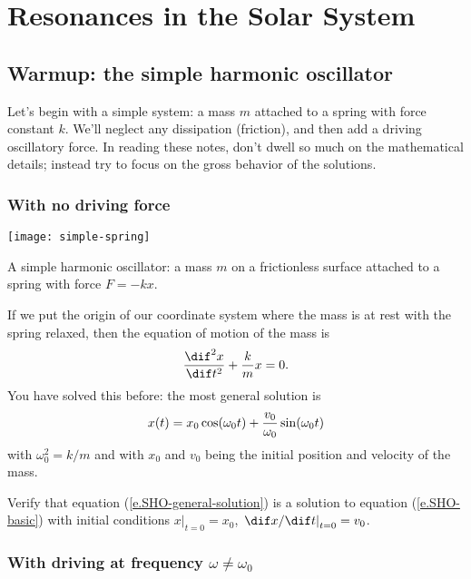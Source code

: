 \chapter{Resonances in the Solar System}

\section{Warmup: the simple harmonic oscillator}

Let's begin with a simple system: a mass $m$ attached to a spring with force constant $k$. We'll neglect any dissipation (friction), and then add a driving oscillatory force. In reading these notes, don't dwell so much on the mathematical details; instead try to focus on the gross behavior of the solutions.

\subsection{With no driving force}

\begin{marginfigure}
\texttt{[image: simple-spring]}
\caption[A simple harmonic oscillator]{A simple harmonic oscillator: a mass $m$ on a frictionless surface attached to a  spring with force $F = -kx$.
\label{f.simple-spring}}
\end{marginfigure}

If we put the origin of our coordinate system where the mass is at rest with the spring relaxed, then the equation of motion of the mass is
\begin{equation}\label{e.SHO-basic}
	\DDtt{x} + \frac{k}{m} x = 0.
\end{equation}
You have solved this before: the most general solution is
\begin{equation}\label{e.SHO-general-solution}
	x(t) = x_{0}\cos(\omega_{0} t) + \frac{v_{0}}{\omega_{0}}\sin(\omega_{0} t)
\end{equation}
with $\omega_{0}^{2} = k/m$ and with $x_{0}$ and $v_{0}$ being the initial position and velocity of the mass.

\begin{exercisebox}
Verify that equation (\ref{e.SHO-general-solution}) is a solution to equation (\ref{e.SHO-basic}) with initial conditions $\left.x\right|_{t=0}=x_{0}$, $\left.\dif x/\dif t\right|_{t=0} = v_{0}$.
\end{exercisebox}

\subsection{With driving at frequency $\omega \neq \omega_{0}$}

